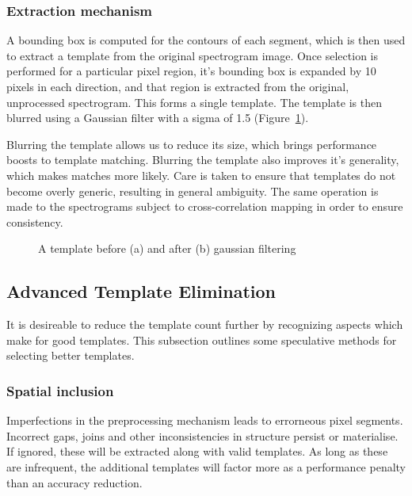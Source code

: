 \subsubsection{Extraction mechanism}\label{sec:extract}

A bounding box is computed for the contours of each segment, which is then used
to extract a template from the original spectrogram image.
Once selection is performed for a particular pixel region, it's bounding box is
expanded by 10 pixels in each direction, and that region is extracted from the
original, unprocessed spectrogram.
This forms a single template.
The template is then blurred using a Gaussian filter with a sigma of 1.5
(Figure~\ref{fig:extract_blur}).

Blurring the template allows us to reduce its size, which brings performance
boosts to template matching.
Blurring the template also improves it's generality, which makes matches more
likely.
Care is taken to ensure that templates do not become overly generic, resulting
in general ambiguity.
The same operation is made to the spectrograms subject to cross-correlation
mapping in order to ensure consistency.

\begin{figure}[h]
  \centering
  \begin{subfigure}[h]{0.5\textwidth}
    \centering
    \caption{}
  \end{subfigure}
  \begin{subfigure}[h]{0.5\textwidth}
    \centering
    \caption{}
  \end{subfigure}
  \caption{A template before (a) and after (b) gaussian filtering}
  \label{fig:extract_blur}
\end{figure}

\subsection{Advanced Template Elimination}
It is desireable to reduce the template count further by recognizing aspects which
make for good templates. This subsection outlines some speculative methods for
selecting better templates.

\subsubsection{Spatial inclusion}
Imperfections in the preprocessing mechanism leads to errorneous pixel segments.
Incorrect gaps, joins and other inconsistencies in structure persist or
materialise.
If ignored, these will be extracted along with valid templates.
As long as these are infrequent, the additional templates will factor more as
a performance penalty than an accuracy reduction.

